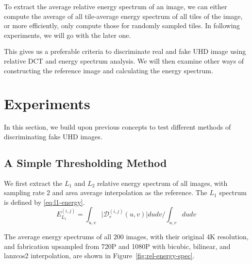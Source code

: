 \documentclass[journal,conference]{IEEEtran}
\begin{document}
To extract the average relative energy spectrum of an image, we can either compute the average of all tile-average energy spectrum of all tiles of the image, or more efficiently, only compute those for randomly sampled tiles.
In following experiments, we will go with the later one.

This gives us a preferable criteria to discriminate real and fake UHD image using relative DCT and energy spectrum analysis.
We will then examine other ways of constructing the reference image and calculating the energy spectrum.

\section{Experiments}
In this section, we build upon previous concepts to test different methods of discriminating fake UHD images.

\subsection{A Simple Thresholding Method}
We first extract the $L_1$ and $L_2$ relative energy spectrum of all images, with sampling rate 2 and area average interpolation as the reference.
The $L_1$ spectrum is defined by \eqref{eq:l1-energy}.
\begin{equation}
	E_{L_1}^{(i, j)} = \int_{u,v} \big|\mathcal{D}_r^{(i, j)}(u, v)\big| dudv \Big/ \int_{u,v} dudv
	\label{eq:l1-energy}
\end{equation}

The average energy spectrums of all 200 images, with their original 4K resolution, and fabrication upsampled from 720P and 1080P with bicubic, bilinear, and lanzcos2 interpolation, are shown in Figure~\ref{fig:rel-energy-spec}.
\end{document}
